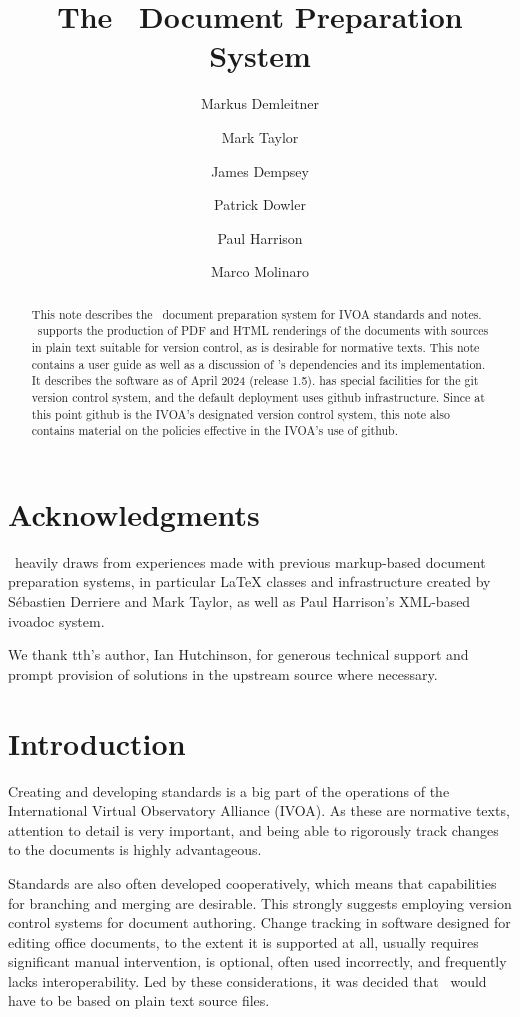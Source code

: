 \documentclass[11pt,a4paper]{ivoa}
\title{The \ivoatex\ Document Preparation System}
\author[http://www.ivoa.net/cgi-bin/twiki/bin/view/IVOA/MarkusDemleitner]{Markus Demleitner}
\author[http://www.ivoa.net/cgi-bin/twiki/bin/view/IVOA/MarkTaylor]{Mark Taylor}
\author[http://www.ivoa.net/cgi-bin/twiki/bin/view/IVOA/JamesDempsey]{James Dempsey}
\author[http://www.ivoa.net/cgi-bin/twiki/bin/view/IVOA/PatrickDowler]{Patrick Dowler}
\author[http://www.ivoa.net/cgi-bin/twiki/bin/view/IVOA/PaulHarrison]{Paul Harrison}
\author[http://www.ivoa.net/cgi-bin/twiki/bin/view/IVOA/MarcoMolinaro]{Marco Molinaro}
\begin{document}
\begin{abstract}
This note describes the \ivoatex\ document preparation system for IVOA
standards and notes.  \ivoatex\ supports the production of
PDF and HTML renderings of the documents with sources in
plain text suitable for version control, as is desirable for normative
texts.  This note contains a user guide as well as a discussion of
\ivoatex's dependencies and its implementation.  It describes the
software as of April 2024 (release 1.5).
\ivoatex{} has special facilities for the git version control system,
and the default deployment uses github infrastructure.  Since at this
point github is the IVOA's designated version control system, this note
also contains material on the policies effective in the IVOA's use of
github.

\end{abstract}


\section*{Acknowledgments}

\ivoatex\ heavily draws from experiences made with previous markup-based
document preparation systems, in particular LaTeX classes and
infrastructure created by S\'ebastien Derriere and Mark Taylor, as well
as Paul Harrison's XML-based ivoadoc system.

We thank tth's author, Ian Hutchinson, for generous technical support
and prompt provision of solutions in the upstream source where necessary.

\section{Introduction}

Creating and developing standards is a  big part of the operations of
the International Virtual Observatory Alliance (IVOA).
As these are normative texts, attention to detail is very important, and
being able to rigorously track changes to the documents is highly
advantageous.

Standards are also often developed cooperatively, which means that
capabilities for branching and merging are desirable.  This strongly
suggests employing version control systems for document authoring.
Change tracking in software designed for editing office documents, to
the extent it is supported at all, usually requires significant
manual intervention, is optional, often used incorrectly, and frequently
lacks interoperability.  Led by these considerations, it was decided that
\ivoatex\ would have to be based on plain text source files.
\end{document}
